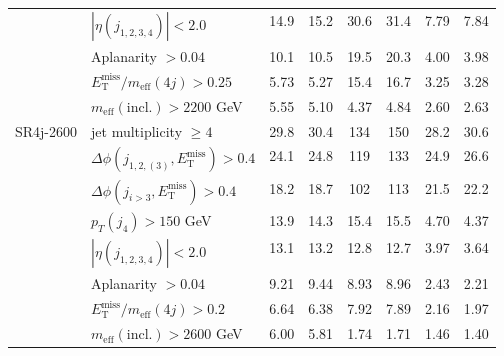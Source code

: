 \documentclass[10pt,fleqn]{article}
\newcommand{\met}{E^\mathrm{miss}_\mathrm{T}}
\newcommand{\meff}{m_\mathrm{eff}}
\begin{document}
\begin{table}[h!]
\begin{tabular}{c|l|c|c|c|c|c|c}
             & $|\eta(j_{1,2,3,4})|< 2.0$                      &     14.9   &   15.2    &  30.6      &   31.4    &      7.79    &   7.84         \\           
             & Aplanarity $> 0.04$                             &     10.1   &   10.5    &  19.5      &   20.3    &      4.00    &   3.98         \\           
             & $\met/\meff(4j) > 0.25$                         &     5.73   &   5.27    &  15.4      &   16.7    &      3.25    &   3.28         \\    
             & $\meff(\mathrm{incl.}) > 2200$ GeV              &     5.55   &   5.10    &  4.37      &   4.84    &      2.60    &   2.63         \\ \midrule             
SR4j-2600    & jet multiplicity $\geq 4$                       &     29.8   &   30.4    &  134       &   150     &      28.2    &   30.6         \\
             & $\Delta\phi(j_{1,2,(3)},\met) > 0.4$            &     24.1   &   24.8    &  119       &   133     &      24.9    &   26.6         \\
             & $\Delta\phi(j_{i>3},\met) > 0.4$                &     18.2   &   18.7    &  102       &   113     &      21.5    &   22.2         \\
             & $p_T(j_4) > 150$ GeV                            &     13.9   &   14.3    &  15.4      &   15.5    &      4.70    &   4.37         \\      
             & $|\eta(j_{1,2,3,4})|< 2.0$                      &     13.1   &   13.2    &  12.8      &   12.7    &      3.97    &   3.64         \\           
             & Aplanarity $> 0.04$                             &     9.21   &   9.44    &  8.93      &   8.96    &      2.43    &   2.21         \\           
             & $\met/\meff(4j) > 0.2$                          &     6.64   &   6.38    &  7.92      &   7.89    &      2.16    &   1.97         \\    
             & $\meff(\mathrm{incl.}) > 2600$ GeV              &     6.00   &   5.81    &  1.74      &   1.71    &      1.46    &   1.40         \\ \bottomrule 
\end{tabular}
\end{table}             
\end{document}
